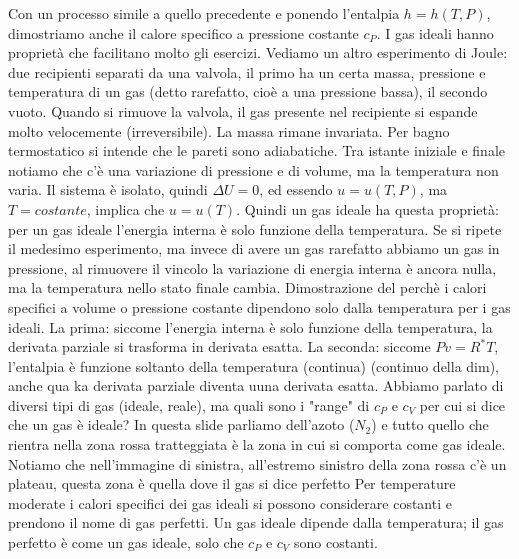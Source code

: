 \newline[17] Con un processo simile a quello precedente e ponendo l'entalpia $h = h(T,P)$, dimostriamo anche il calore specifico a pressione costante $c_P$.
\newline[18]
\newline[19] I gas ideali hanno proprietà che facilitano molto gli esercizi. Vediamo un altro esperimento di Joule: due recipienti separati da una valvola, il primo ha un certa massa, pressione e temperatura di un gas (detto rarefatto, cioè a una pressione bassa), il secondo vuoto. Quando si rimuove la valvola, il gas presente nel recipiente si espande molto velocemente (irreversibile). La massa rimane invariata. Per bagno termostatico si intende che le pareti sono adiabatiche. 
\newline[20] Tra istante iniziale e finale notiamo che c'è una variazione di pressione e di volume, ma la temperatura non varia. Il sistema è isolato, quindi $\Delta U = 0$, ed essendo $u = u(T,P)$, ma $T = costante$, implica che $u = u(T)$. Quindi un gas ideale ha questa proprietà: per un gas ideale l'energia interna è solo funzione della temperatura. Se si ripete il medesimo esperimento, ma invece di avere un gas rarefatto abbiamo un gas in pressione, al rimuovere il vincolo la variazione di energia interna è ancora nulla, ma la temperatura nello stato finale cambia. 
\newline[21]
\newline[22] Dimostrazione del perchè i calori specifici a volume o pressione costante dipendono solo dalla temperatura per i gas ideali. La prima: siccome l'energia interna è solo funzione della temperatura, la derivata parziale si trasforma in derivata esatta. La seconda: siccome $Pv = R^* T$, l'entalpia è funzione soltanto della temperatura (continua)
\newline[23] (continuo della dim), anche qua ka derivata parziale diventa uuna derivata esatta.
\newline[24] Abbiamo parlato di diversi tipi di gas (ideale, reale), ma quali sono i "range" di $c_P$ e $c_V$ per cui si dice che un gas è ideale? In questa slide parliamo dell'azoto ($N_2$) e tutto quello che rientra nella zona rossa tratteggiata è la zona in cui si comporta come gas ideale. Notiamo che nell'immagine di sinistra, all'estremo sinistro della zona rossa c'è un plateau, questa zona è quella dove il gas si dice perfetto
\newline[25] Per temperature moderate i calori specifici dei gas ideali si possono considerare costanti e prendono il nome di gas perfetti. Un gas ideale dipende dalla temperatura; il gas perfetto è come un gas ideale, solo che $c_P$ e $c_V$ sono costanti. 
